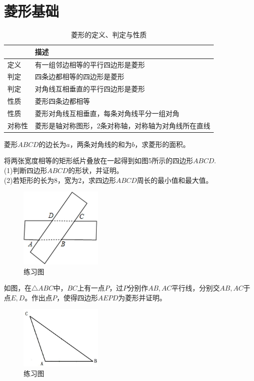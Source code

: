 \documentclass{ecnuthesis}
\begin{document}
\section{菱形基础}
\begin{table}[H]
\centering
\caption{菱形的定义、判定与性质}
\begin{tabular}{|l|l|}
\hline
    & 描述 \\
\hline
定义 & 有一组邻边相等的平行四边形是菱形 \\
\hline
判定 & 四条边都相等的四边形是菱形 \\
\hline
判定 & 对角线互相垂直的平行四边形是菱形 \\
\hline
性质 & 菱形四条边都相等 \\
\hline
性质 & 菱形对角线互相垂直，每条对角线平分一组对角 \\
\hline
对称性 & 菱形是轴对称图形，2条对称轴，对称轴为对角线所在直线 \\
\hline
\end{tabular}
\end{table}
\begin{problem}
    菱形$ABCD$的边长为$a$，两条对角线的和为$b$，求菱形的面积。
\end{problem}
\begin{problem}
    将两张宽度相等的矩形纸片叠放在一起得到如图5所示的四边形$ABCD$. \\
    (1)判断四边形$ABCD$的形状，并证明。 \\
    (2)若矩形的长为8，宽为2，求四边形$ABCD$周长的最小值和最大值。 \\
\end{problem}
\begin{figure}[H]
\centering
\includegraphics[width=4cm]{picture/607.png}
\caption{练习图}
\end{figure}
\begin{problem}
    如图，在$\triangle ABC$中，$BC$上有一点$P$，过$P$分别作$AB,AC$平行线，分别交$AB,AC$于点$E,D$。作出点$P$，使得四边形$AEPD$为菱形并证明。
\end{problem}
\begin{figure}[H]
\centering
\includegraphics[width=4cm]{picture/635.jpg}
\caption{练习图}
\end{figure}
\end{document}
